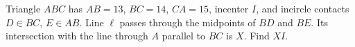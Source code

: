 Triangle $ ABC $ has $ AB=13 $, $ BC=14 $, $ CA=15 $, incenter $ I $, and incircle contacts $ D\in BC $, $ E\in AB $. Line $\ell $ passes through the midpoints of $ BD $ and $ BE $. Its intersection with the line through $ A $ parallel to $ BC $ is $ X $. Find $ XI $.
